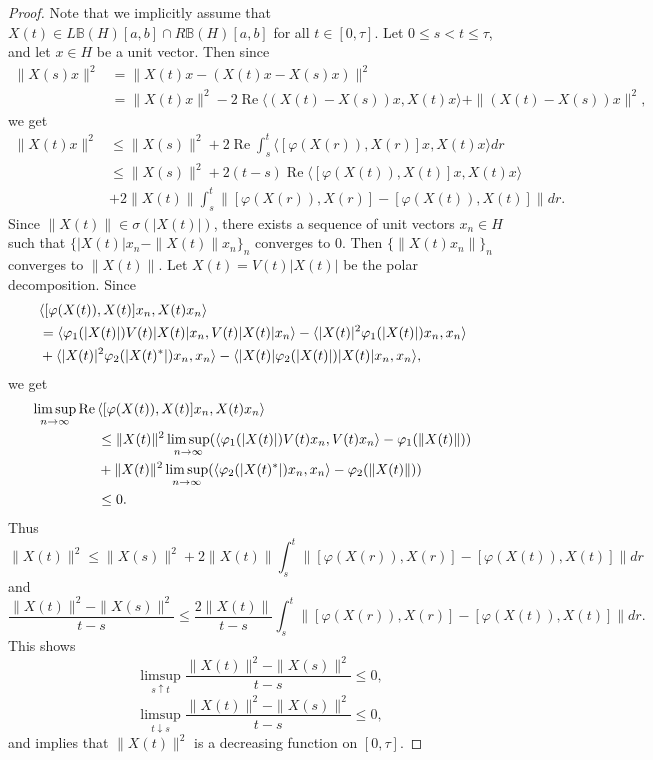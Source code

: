 \documentclass[12pt]{article}
\theoremstyle{definition}
\numberwithin{equation}{section}
\newcommand{\B}{\mathbb{B}}
\renewcommand{\Re}{\operatorname{Re}}
\newcommand{\inpr}[2]{\langle{#1,#2}\rangle}
\begin{document}
\begin{proof} Note that we implicitly assume that $X(t)\in L\B(H)[a,b]\cap R\B(H)[a,b]$ 
for all $t\in [0,\tau]$.  
Let $0\leq s< t\leq\tau$, and let $x\in H$ be a unit vector. 
Then since 
\begin{align*}
	\|X(s)x\|^2 &= \|X(t)x-(X(t)x-X(s)x)\|^2\\
	&= \|X(t)x\|^2-2\Re \inpr{(X(t)-X(s))x}{X(t)x}+\|(X(t)-X(s))x\|^2, 
\end{align*}
we get 
\begin{align*}
\|X(t)x\|^2	 &\leq \|X(s)\|^2+2\Re\int_s^t\inpr{[\varphi(X(r)),X(r)]x}{X(t)x}dr \\
	 &\leq \|X(s)\|^2+2(t-s)\Re \inpr{[\varphi(X(t)),X(t)]x}{X(t)x}\\
	 &+2\|X(t)\| \int_s^t\|[\varphi(X(r)),X(r)]-[\varphi(X(t)),X(t)]\|dr.
\end{align*}
Since $\|X(t)\|\in \sigma(|X(t)|)$, there exists a sequence of unit vectors $x_n\in H$ such that  
$\{|X(t)|x_n-\|X(t)\|x_n\}_n$ converges to 0. 
Then $\{\|X(t)x_n\|\}_n$ converges to $\|X(t)\|$. 
Let $X(t)=V(t)|X(t)|$ be the polar decomposition. 
Since 
\begin{align*}
\lefteqn{\inpr{[\varphi(X(t)),X(t)]x_n}{X(t)x_n}}	 \\
&=\inpr{\varphi_1(|X(t)|)V(t)|X(t)|x_n}{V(t)|X(t)|x_n}-\inpr{|X(t)|^2\varphi_1(|X(t)|)x_n}{x_n}\\
&+\inpr{|X(t)|^2\varphi_2(|X(t)^*|)x_n}{x_n}-\inpr{|X(t)|\varphi_2(|X(t)|)|X(t)|x_n}{x_n}, 
\end{align*}
we get 
\begin{align*}
	\limsup_{n\to\infty}\Re\lefteqn{\inpr{[\varphi(X(t)),X(t)]x_n}{X(t)x_n}}\\
	&\leq\|X(t)\|^2\limsup_{n\to\infty}(\inpr{\varphi_1(|X(t)|)V(t)x_n}{V(t)x_n}-\varphi_1(\|X(t)\|))\\
	&+\|X(t)\|^2\limsup_{n\to\infty}(\inpr{\varphi_2(|X(t)^*|)x_n}{x_n}-\varphi_2(\|X(t)\|))\\
	&\leq 0.
\end{align*}
Thus 
\[\|X(t)\|^2\leq \|X(s)\|^2+2\|X(t)\| \int_s^t\|[\varphi(X(r)),X(r)]-[\varphi(X(t)),X(t)]\|dr\]
and 
\[\frac{\|X(t)\|^2-\|X(s)\|^2}{t-s}\leq \frac{2\|X(t)\|}{t-s}\int_s^t\|[\varphi(X(r)),X(r)]-[\varphi(X(t)),X(t)]\|dr.\]
This shows 
\[\limsup_{s\uparrow t}\frac{\|X(t)\|^2-\|X(s)\|^2}{t-s}\leq 0,\]
\[\limsup_{t\downarrow s}\frac{\|X(t)\|^2-\|X(s)\|^2}{t-s}\leq 0,\]
and \cite[Chapter 4, Theorem 1.2]{Br1994} implies that $\|X(t)\|^2$ is a decreasing function on $[0,\tau]$. 


\end{proof}
\end{document}

